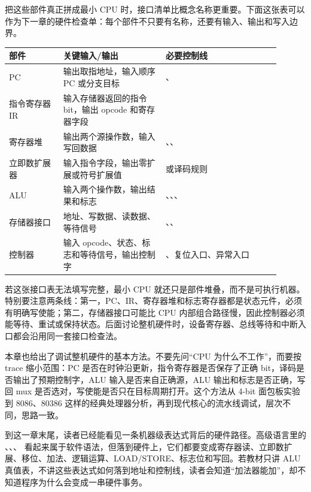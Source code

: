 把这些部件真正拼成最小 CPU 时，接口清单比概念名称更重要。下面这张表可以作为下一章的硬件检查单：每个部件不只要有名称，还要有输入、输出和写入边界。

\begin{longtable}{L{0.18\linewidth}L{0.34\linewidth}L{0.38\linewidth}}
\toprule
部件 & 关键输入/输出 & 必要控制线 \\
\midrule
PC & 输出取指地址，输入顺序 PC 或分支目标 & 、 \\
指令寄存器 IR & 输入存储器返回的指令 bit，输出 opcode 和寄存器字段 &  \\
寄存器堆 & 输出两个源操作数，输入写回数据 & 、、 \\
立即数扩展器 & 输入指令字段，输出零扩展或符号扩展值 &  或译码规则 \\
ALU & 输入两个操作数，输出结果和标志 & 、、、 \\
存储器接口 & 地址、写数据、读数据、等待信号 & 、、 \\
控制器 & 输入 opcode、状态、标志和等待信号，输出控制字 & 、复位入口、异常入口 \\
\bottomrule
\end{longtable}

若这张接口表无法填写完整，最小 CPU 就还只是部件堆叠，而不是可执行机器。特别要注意两条线：第一，PC、IR、寄存器堆和标志寄存器都是状态元件，必须有明确写使能；第二，存储器接口可能比 CPU 内部组合路径慢，因此控制器必须能等待、重试或保持状态。后面讨论整机硬件时，设备寄存器、总线等待和中断入口都会沿用同一套接口检查法。

本章也给出了调试整机硬件的基本方法。不要先问“CPU 为什么不工作”，而要按 trace 缩小范围：PC 是否在时钟沿更新，指令寄存器是否保存了正确 bit，译码是否输出了预期控制字，ALU 输入是否来自正确源，ALU 输出和标志是否正确，写回 mux 是否选对，写使能是否只在目标周期打开。这个方法从 4-bit 面包板实验到 8086、80386 这样的经典处理器分析，再到现代核心的流水线调试，层次不同，思路一致。

到这一章末尾，读者已经能看见一条机器级表达式背后的硬件路径。高级语言里的 、、、 看起来属于软件语法，但落到硬件上，它们都要变成寄存器读、立即数扩展、移位、加法、逻辑运算、LOAD/STORE、标志位和写回。若教材只讲 ALU 真值表，不讲这些表达式如何落到地址和控制线，读者会知道“加法器能加”，却不知道程序为什么会变成一串硬件事务。

